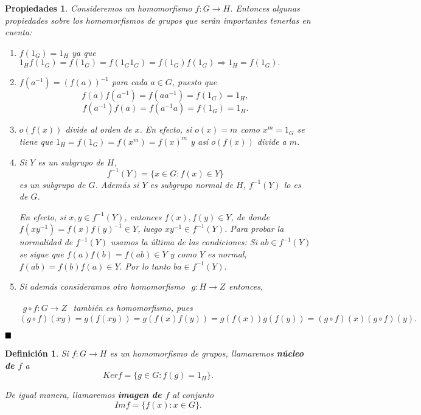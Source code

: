 \documentclass[12pt]{article}
\newtheorem{definition}[theorem]{Definición}
\newtheorem{properties}{Propiedades}[theorem]
\begin{document}
\begin{properties}\label{eq:propHoms} Consideremos un homomorfismo $f \colon G \longrightarrow H$. Entonces algunas propiedades sobre los homomorfismos de grupos que serán importantes tenerlas en cuenta:
\begin{enumerate}
\item $f(1_{G}) = 1_{H}$ ya que $1_{H}f(1_{G}) = f(1_{G}) = f(1_{G}1_{G}) = f(1_{G})f(1_{G}) \Longrightarrow 1_{H} = f(1_{G}).$
\item $f(a^{-1}) = (f(a))^{-1}$ para cada $a \in G$, puesto que $$f(a)f(a^{-1}) = f(aa^{-1}) = f(1_{G}) = 1_{H},$$ $$f(a^{-1})f(a) = f(a^{-1}a) = f(1_{G}) = 1_{H}.$$
\item $o(f(x))$ divide al orden de $x$. En efecto, si $o(x) = m$ como $x^{m} = 1_{G}$ se tiene que $1_{H} = f(1_{G}) = f(x^{m}) = f(x)^{m}$ y así $o(f(x))$ divide a $m$. 
\item Si $Y$ es un subgrupo de $H$, $$f^{-1}(Y) = \lbrace x \in G : f(x) \in Y\rbrace$$ es un subgrupo de $G$. Además si $Y$ es subgrupo normal de $H$, $f^{-1}(Y)$ lo es de $G$.

En efecto, si $x,y \in f^{-1}(Y)$, entonces $f(x),f(y) \in Y$, de donde $f(xy^{-1}) = f(x)f(y)^{-1} \in Y$, luego $xy^{-1} \in f^{-1}(Y)$. Para probar la normalidad de $f^{-1}(Y)$ usamos la última de las condiciones: Si $ab \in f^{-1}(Y)$ se sigue que $f(a)f(b) = f(ab) \in Y$ y como $Y$ es normal, $f(ab) = f(b)f(a) \in Y.$ Por lo tanto $ba \in f^{-1}(Y).$
 
\item Si además consideramos otro homomorfismo $
\begin{array}{rccl}
g\colon H \longrightarrow  Z
\end{array}
$entonces,

$\begin{array}{rccl}
g \circ f\colon G \longrightarrow  Z
\end{array}
$ también es homomorfismo, pues $$ (g \circ f)(xy) = g(f(xy)) = g(f(x)f(y)) = g(f(x))g(f(y)) = (g \circ f)(x) (g \circ f)(y).$$
\end{enumerate}
\end{properties}
$\hfill \blacksquare$

\begin{definition}Si $f \colon G \longrightarrow H$ es un homomorfismo de grupos, llamaremos \textbf{núcleo de $f$} a $$Ker f= \lbrace g \in G: f(g) = 1_H \rbrace.$$

De igual manera, llamaremos \textbf{imagen de $f$} al conjunto $$Im f = \lbrace f(x) : x \in G\rbrace.$$
\end{definition}
\end{document}
